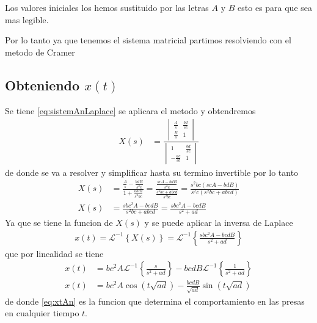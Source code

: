 \documentclass{report}
\begin{document}
Los valores iniciales los hemos sustituido por las letras $A$ y $B$ esto es para que sea mas legible.

Por lo tanto ya que tenemos el sistema matricial partimos resolviendo con el metodo de Cramer
\subsection{Obteniendo $x(t)$}
Se tiene \ref{eq:sistemAnLaplace} se aplicara el metodo y obtendremos
\begin{align*}
X(s) &= \frac{\begin{vmatrix}
\frac{A}{s} &\frac{bd}{sc} \\
\frac{B}{s} &1
\end{vmatrix}}{
\begin{vmatrix}
1 &\frac{bd}{sc} \\
-\frac{ac}{sb} &1
\end{vmatrix}}
\end{align*}
de donde se va a resolver y simplificar hasta su termino invertible por lo tanto
\begin{align}
X(s)&=
\frac{\frac{A}{s}-{\frac{bdB}{s^2c}}}{
1+\frac{abcd}{s^2bc}}
=
\frac{\frac{scA-bdB}{s^2c}}{
\frac{s^2bc+abcd}{s^2bc}}
=
\frac{s^2bc(scA-bdB)}{s^2c(s^2bc+abcd)}\nonumber
\\X(s)&=
\frac{sbc^2A-bcdB}{s^2bc+abcd} 
=\frac{sbc^2A-bcdB}{s^2+ad} 
\end{align}
Ya que se tiene la funcion de $X(s)$ y se puede aplicar la inversa de Laplace
\begin{align*}
x(t)=\mathcal{L}^{-1}\left\{X(s) \right\}
=\mathcal{L}^{-1}\left\{  \frac{sbc^2A-bcdB}{s^2+ad}   \right\}
\end{align*}
que por linealidad se tiene
\begin{align}
x(t)
&=bc^2A\mathcal{L}^{-1}\left\{  \frac{s}{s^2+ad} \right\}-bcdB\mathcal{L}^{-1}\left\{
\frac{1}{s^2+ad} \right\} \nonumber
\\x(t)&=bc^2A\cos(t\sqrt{ad})-\frac{bcdB}{\sqrt{ad}}\sin(t\sqrt{ad}) \label{eq:xtAn}
\end{align}
de donde \ref{eq:xtAn} es la funcion que determina el comportamiento en las presas en cualquier tiempo $t$.
\end{document}

